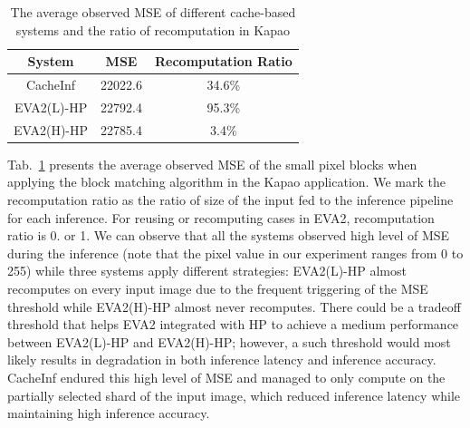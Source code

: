 \begin{table}[h!]
    \begin{tabular}{c|c|c}
        \toprule
        System & MSE & Recomputation Ratio\\
        \midrule
        CacheInf & 22022.6 & 34.6\% \\ 
        EVA2(L)-HP & 22792.4 & 95.3\% \\ 
        EVA2(H)-HP & 22785.4  & 3.4\% \\ 
        \bottomrule

    \end{tabular}
    \caption[sample rates]{The average observed MSE of different cache-based systems and the ratio of recomputation in Kapao}
    \label{mse}
\end{table}
Tab.~\ref{mse} presents the average observed MSE of the small pixel blocks when applying the block matching algorithm in the Kapao application.
We mark the recomputation ratio as the ratio of size of the input fed to the inference pipeline for each inference.
For reusing or recomputing cases in EVA2, recomputation ratio is 0. or 1.
We can observe that all the systems observed high level of MSE during the inference (note that the pixel value in our experiment ranges from 0 to 255) while three systems apply different strategies: EVA2(L)-HP almost recomputes on every input image due to the frequent triggering of the MSE threshold while EVA2(H)-HP almost never recomputes.
There could be a tradeoff threshold that helps EVA2 integrated with HP to achieve a medium performance between EVA2(L)-HP and EVA2(H)-HP; however, a such threshold would most likely results in degradation in both inference latency and inference accuracy.
CacheInf endured this high level of MSE and managed to only compute on the partially selected shard of the input image, which reduced inference latency while maintaining high inference accuracy.

